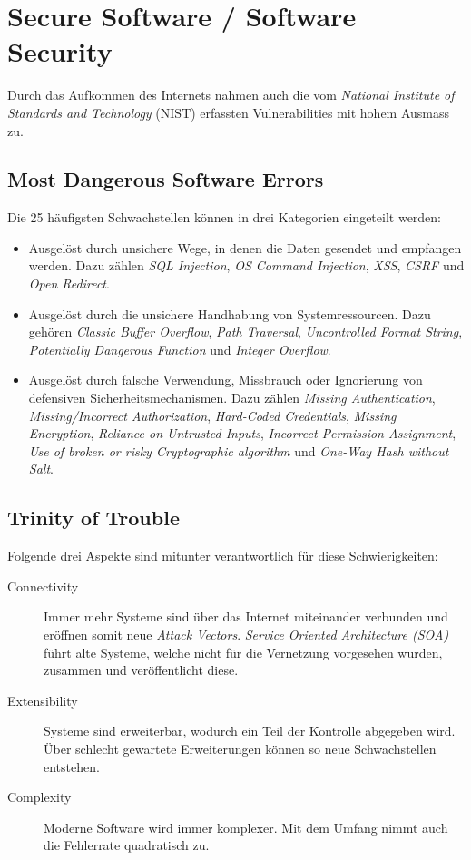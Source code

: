 \section{Secure Software / Software Security}

Durch das Aufkommen des Internets nahmen auch die vom \textit{National Institute of Standards and Technology} (NIST) erfassten Vulnerabilities mit hohem Ausmass zu.

\subsection{Most Dangerous Software Errors}
Die 25 häufigsten Schwachstellen können in drei Kategorien eingeteilt werden:
\begin{itemize}
	\item Ausgelöst durch unsichere Wege, in denen die Daten gesendet und empfangen werden. Dazu zählen \textit{SQL Injection}, \textit{OS Command Injection}, \textit{XSS}, \textit{CSRF} und \textit{Open Redirect}.
	\item Ausgelöst durch die unsichere Handhabung von Systemressourcen. Dazu gehören \textit{Classic Buffer Overflow}, \textit{Path Traversal}, \textit{Uncontrolled Format String}, \textit{Potentially Dangerous Function} und \textit{Integer Overflow}.
	\item Ausgelöst durch falsche Verwendung, Missbrauch oder Ignorierung von defensiven Sicherheitsmechanismen. Dazu zählen \textit{Missing Authentication}, \textit{Missing/Incorrect Authorization}, \textit{Hard-Coded Credentials}, \textit{Missing Encryption}, \textit{Reliance on Untrusted Inputs}, \textit{Incorrect Permission Assignment}, \textit{Use of broken or risky Cryptographic algorithm} und \textit{One-Way Hash without Salt}.
\end{itemize}

\subsection{Trinity of Trouble}
Folgende drei Aspekte sind mitunter verantwortlich für diese Schwierigkeiten:
\begin{description}
	\item[Connectivity] Immer mehr Systeme sind über das Internet miteinander verbunden und eröffnen somit neue \textit{Attack Vectors}. \textit{Service Oriented Architecture (SOA)} führt alte Systeme, welche nicht für die Vernetzung vorgesehen wurden, zusammen und veröffentlicht diese.
	\item[Extensibility] Systeme sind erweiterbar, wodurch ein Teil der Kontrolle abgegeben wird. Über schlecht gewartete Erweiterungen können so neue Schwachstellen entstehen.
	\item[Complexity] Moderne Software wird immer komplexer. Mit dem Umfang nimmt auch die Fehlerrate quadratisch zu.
\end{description}

